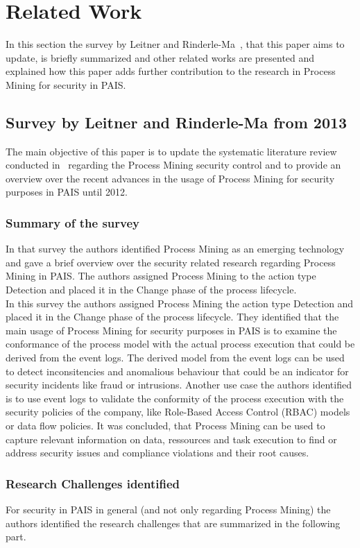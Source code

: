 \documentclass[runningheads]{llncs}
\begin{document}
\section{Related Work}\label{Related}
In this section the survey by Leitner and Rinderle-Ma~\cite{Leitner2014273}, that this paper aims to update, is briefly summarized and other related works are presented and explained how
this paper adds further contribution to the research in Process Mining for security in PAIS.\\
\subsection{Survey by Leitner and Rinderle-Ma from 2013}\label{basepaper}
The main objective of this paper is to update the systematic literature review conducted in~\cite{Leitner2014273} regarding the Process Mining security control and to provide an overview over the recent advances
in the usage of Process Mining for security purposes in PAIS until 2012.
\subsubsection{Summary of the survey}\label{Summary}
In that survey the authors identified Process Mining as an emerging technology and gave a brief overview
over the security related research regarding Process Mining in PAIS\@. The authors assigned Process Mining to the action type Detection and placed it in the Change phase of the
process lifecycle.\\
In this survey the authors assigned Process Mining the action type Detection and placed it in the Change phase of the process lifecycle. They identified that the main usage of
Process Mining for security purposes in PAIS is to examine the conformance of the process model with the actual process execution that could be derived from the event logs.
The derived model from the event logs can be used to detect inconsitencies and anomalious behaviour that could be an indicator for security incidents like fraud or intrusions.
Another use case the authors identified is to use event logs to validate the conformity of the process execution with the security policies of the company, like
Role-Based Access Control (RBAC) models or data flow
policies. It was concluded, that Process Mining can be used to capture relevant information on data, ressources and task execution to find or address security issues and compliance
violations and their root causes.\\
\subsubsection{Research Challenges identified}\label{Challenges}
For security in PAIS in general (and not only regarding Process Mining) the authors identified the research challenges that are summarized in the following part.
\end{document}

